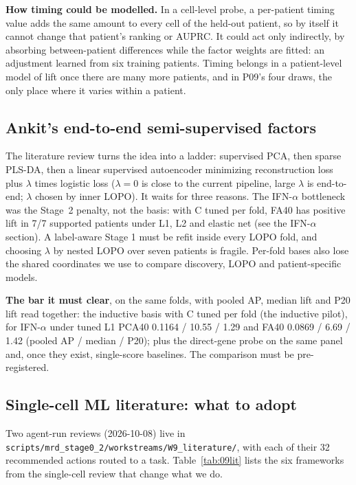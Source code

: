 \textbf{How timing could be modelled.} In a cell-level probe, a per-patient timing value adds the same amount to every cell of the held-out patient, so by itself it cannot change that patient's ranking or AUPRC. It could act only indirectly, by absorbing between-patient differences while the factor weights are fitted: an adjustment learned from six training patients. Timing belongs in a patient-level model of lift once there are many more patients, and in P09's four draws, the only place where it varies within a patient.

\subsection{Ankit's end-to-end semi-supervised factors}

The literature review turns the idea into a ladder: supervised PCA, then sparse PLS-DA, then a linear supervised autoencoder minimizing reconstruction loss plus $\lambda$ times logistic loss ($\lambda = 0$ is close to the current pipeline, large $\lambda$ is end-to-end; $\lambda$ chosen by inner LOPO). It waits for three reasons. The IFN-$\alpha$ bottleneck was the Stage~2 penalty, not the basis: with C tuned per fold, FA40 has positive lift in 7/7 supported patients under L1, L2 and elastic net (see the IFN-$\alpha$ section). A label-aware Stage 1 must be refit inside every LOPO fold, and choosing $\lambda$ by nested LOPO over seven patients is fragile. Per-fold bases also lose the shared coordinates we use to compare discovery, LOPO and patient-specific models.

\textbf{The bar it must clear}, on the same folds, with pooled AP, median lift and P20 lift read together: the inductive basis with C tuned per fold (the inductive pilot), for IFN-$\alpha$ under tuned L1 PCA40 0.1164 / 10.55 / 1.29\pp{} and FA40 0.0869 / 6.69 / 1.42\pp{} (pooled AP / median / P20); plus the direct-gene probe on the same panel and, once they exist, single-score baselines. The comparison must be pre-registered.

\subsection{Single-cell ML literature: what to adopt}

Two agent-run reviews (2026-10-08) live in \texttt{scripts/\allowbreak mrd\_stage0\_2/\allowbreak workstreams/\allowbreak W9\_literature/}, with each of their 32 recommended actions routed to a task. Table~\ref{tab:09lit} lists the six frameworks from the single-cell review that change what we do.

